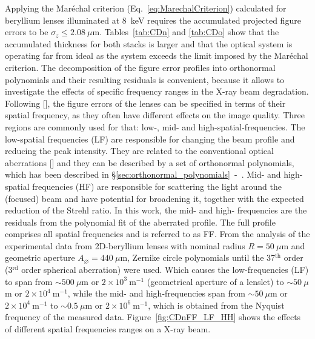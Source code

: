 \begin{refsection}
Applying the Mar\'echal criterion (Eq.~\ref{eq:MarechalCriterion}) calculated for beryllium lenses illuminated at 8~keV requires the accumulated projected figure errors to be $\sigma_z\leq2.08~\mu\text{m}$. Tables~\ref{tab:CDn} and \ref{tab:CDo} show that the accumulated thickness for both stacks is larger and that the optical system is operating far from ideal as the system exceeds the limit imposed by the Mar\'echal criterion. The decomposition of the figure error profiles into orthonormal polynomials and their resulting residuals is convenient, because it allows to investigate the effects of specific frequency ranges in the X-ray beam degradation. Following [\cite{Harvey1995a}], the figure errors of the lenses can be specified in terms of their spatial frequency, as they often have different effects on the image quality. Three regions are commonly used for that: low-, mid- and high-spatial-frequencies. The low-spatial frequencies (LF) are responsible for changing the beam profile and reducing the peak intensity. They are related to the conventional optical aberrations [\cite[\textit{\S9.1-3}]{born_wolf1999}] and they can be described by a set of orthonormal polynomials, which has been described in \S\ref{sec:orthonormal_polynomials}~-~\textit{}. Mid- and high-spatial frequencies (HF) are responsible for scattering the light around the (focused) beam and have potential for broadening it, together with the expected reduction of the Strehl ratio. In this work, the mid- and high- frequencies are the residuals from the polynomial fit of the aberrated profile. The full profile comprises all spatial frequencies and is referred to as FF. From the analysis of the experimental data from 2D-beryllium lenses with nominal radius $R=50~\mu\text{m}$ and geometric aperture $A_{\diameter}=440~\mu\text{m}$, Zernike circle polynomials until the 37$^\text{th}$ order (3$^\text{rd}$ order spherical aberration) were used. Which causes the low-frequencies (LF) to span from $\sim500~\mu$m or $2\times10^{3}~\text{m}^{-1}$ (geometrical aperture of a lenslet) to $\sim50~\mu$m or $2\times10^{4}~\text{m}^{-1}$, while the mid- and high-frequencies span from $\sim50~\mu$m or $2\times10^{4}~\text{m}^{-1}$ to $\sim0.5~\mu$m or $2\times10^{6}~\text{m}^{-1}$, which is obtained from the Nyquist frequency of the measured data. Figure~\ref{fig:CDnFF_LF_HH} shows the effects of different spatial frequencies ranges on a X-ray beam. 


\end{refsection}
